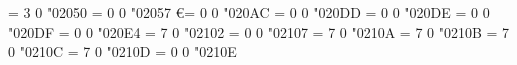 \Umathchardef\closure = 3 0 "02050 %
\Umathchardef\qprime = 0 0 "02057 %
\Umathchardef\euro = 0 0 "020AC %
\def\leftharpoonaccent{\Umathaccent 7 0 "020D0 } %
\def\overleftharpoon{\Umathaccent 7 0 "020D0 } %
\def\rightharpoonaccent{\Umathaccent 7 0 "020D1 } %
\def\overrightharpoon{\Umathaccent 7 0 "020D1 } %
\def\vertoverlay{\Umathaccent 7 0 "020D2 } %
\def\overleftarrow{\Umathaccent 7 0 "020D6 } %
\def\overrightarrow{\Umathaccent 7 0 "020D7 } %
\def\vec{\Umathaccent 7 0 "020D7 } %
\def\dddot{\Umathaccent 7 0 "020DB } %
\def\ddddot{\Umathaccent 7 0 "020DC } %
\Umathchardef\enclosecircle = 0 0 "020DD %
\Umathchardef\enclosesquare = 0 0 "020DE %
\Umathchardef\enclosediamond = 0 0 "020DF %
\def\overleftrightarrow{\Umathaccent 7 0 "020E1 } %
\Umathchardef\enclosetriangle = 0 0 "020E4 %
\def\annuity{\Umathaccent 7 0 "020E7 } %
\def\widebridgeabove{\Umathaccent 7 0 "020E9 } %
\def\asteraccent{\Umathaccent 7 0 "020F0 } %
\Umathchardef\BbbC = 7 0 "02102 %
\Umathchardef\Eulerconst = 0 0 "02107 %
\Umathchardef\mscrg = 7 0 "0210A %
\Umathchardef\mscrH = 7 0 "0210B %
\Umathchardef\mfrakH = 7 0 "0210C %
\Umathchardef\BbbH = 7 0 "0210D %
\Umathchardef\Planckconst = 0 0 "0210E %

